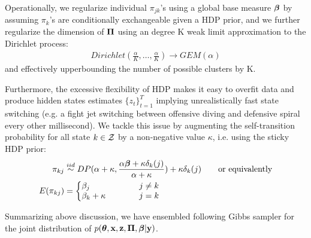 \documentclass{article} %
\begin{document}
Operationally, we regularize individual $\pi_{jk}$'s using a global base measure $\boldsymbol{\beta}$ by assuming $\pi_k$'s are conditionally exchangeable given a HDP prior, and we further regularize the dimension of $\boldsymbol{\Pi}$ using an degree K weak limit approximation to the Dirichlet process:
\begin{align*}
Dirichlet(\frac{\alpha}{K}, \dots, \frac{\alpha}{K}) \rightarrow GEM(\alpha)
\end{align*}
and effectively upperbounding the number of possible clusters by K.

Furthermore, the excessive flexibility of HDP makes it easy to overfit data and produce hidden states estimates $\{z_t\}_{t=1}^T$ implying unrealistically fast state switching (e.g. a fight jet switching between offensive diving and defensive spiral every other millisecond). We tackle this issue by augmenting the self-transition probability for all state $k \in {\cal Z}$ by a non-negative value $\kappa$, i.e. using the sticky HDP prior:
\begin{align*}
\pi_{kj} &\stackrel{iid}{\sim}
DP(\alpha + \kappa, \frac{\alpha\bbeta + \kappa \delta_k(j)}{\alpha + \kappa}) + \kappa \delta_k(j) \qquad \mbox{or equivalently}\\
E(\pi_{kj}) &=
\left\{\begin{matrix*}[l]
\beta_j \qquad &&  j \neq k
\\
\beta_k + \kappa \qquad &&  j = k
\end{matrix*}\right.
\end{align*}

Summarizing above discussion, we have ensembled following Gibbs sampler for the joint distribution of $p(\boldsymbol{\theta}, {\bf x}, {\bf z}, \boldsymbol{\Pi}, \boldsymbol{\beta} | {\bf y})$. 
\end{document}
